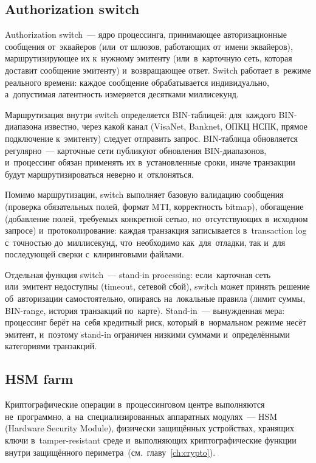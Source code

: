 \subsection*{Authorization switch}

Authorization switch~--- ядро процессинга, принимающее
авторизационные сообщения  от~эквайеров (или~от
шлюзов, работающих от~имени эквайеров), маршрутизирующее их
к~нужному эмитенту (или~в~карточную сеть, которая доставит
сообщение эмитенту) и~возвращающее ответ. Switch работает
в~режиме реального времени: каждое сообщение обрабатывается
индивидуально, а~допустимая латентность измеряется десятками
миллисекунд.

Маршрутизация внутри switch определяется BIN-таблицей:
для~каждого BIN-диапазона известно, через какой канал
(VisaNet, Banknet, ОПКЦ НСПК, прямое подключение к~эмитенту)
следует отправить запрос. BIN-таблица обновляется регулярно~---
карточные сети публикуют обновления BIN-диапазонов, и~процессинг
обязан применять их в~установленные сроки, иначе транзакции
будут маршрутизироваться неверно и~отклоняться.

Помимо маршрутизации, switch выполняет базовую валидацию
сообщения (проверка обязательных полей, формат MTI, корректность
bitmap), обогащение (добавление полей, требуемых конкретной
сетью, но~отсутствующих в~исходном запросе) и~протоколирование:
каждая транзакция записывается в~transaction log с~точностью
до~миллисекунд, что~необходимо как~для~отладки, так и~для
последующей сверки с~клиринговыми файлами.

Отдельная функция switch~--- stand-in processing: если~карточная
сеть или~эмитент недоступны (timeout, сетевой сбой), switch
может принять решение об~авторизации самостоятельно, опираясь
на~локальные правила (лимит суммы, BIN-range, история транзакций
по~карте). Stand-in~--- вынужденная мера: процессинг берёт
на~себя кредитный риск, который в~нормальном режиме несёт
эмитент, и~поэтому stand-in ограничен низкими суммами
и~определёнными категориями транзакций.

\subsection*{HSM farm}

Криптографические операции в~процессинговом центре выполняются
не~программно, а~на~специализированных аппаратных модулях~---
HSM (Hardware Security Module), физически защищённых устройствах,
хранящих ключи в~tamper-resistant среде и~выполняющих
криптографические функции внутри защищённого
периметра~(см.~главу~\ref{ch:crypto}).

